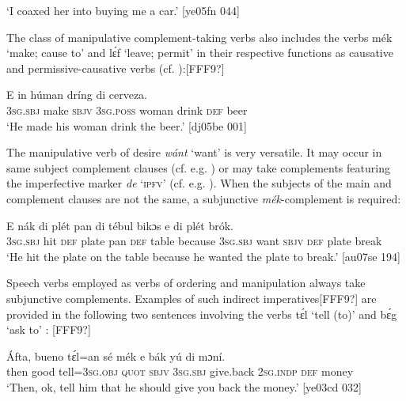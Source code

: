 \glt ‘I coaxed her into buying me a car.’ [ye05fn 044]
\z

The class of manipulative complement-taking verbs also includes the verbs mék ‘make; cause to’  and lɛ́f ‘leave; permit’ in their respective functions as causative and permissive-causative verbs (cf. ):[FFF9?]


\ea%
    \label{ex:key:1399}
    \gll E            in    húman  dríng  di  cerveza.\\
\textsc{3sg.sbj}  make  \textsc{sbjv}    \textsc{3sg.poss}  woman  drink  \textsc{def}  beer\\

\glt ‘He made his woman drink the beer.’ [dj05be 001]
\z

The manipulative verb of desire \textit{wánt} ‘want’ is very versatile. It may occur in same subject complement clauses (cf. e.g. ) or may take complements featuring the imperfective marker \textit{de} ‘\textsc{ipfv}’ (cf. e.g. ). When the subjects of the main and complement clauses are not the same, a subjunctive \textit{mék}{}-complement is required: 


\ea%
    \label{ex:key:1400}
    \gll E    nák  di  plét    pan  di  tébul  bikɔs  e    
    di  plét    brók.\\
\textsc{3sg.sbj}  hit  \textsc{def}  plate  pan  \textsc{def}  table  because  \textsc{3sg.sbj}  want
\textsc{sbjv}    \textsc{def}  plate  break\\

\glt ‘He hit the plate on the table because he wanted the plate to break.’ [au07se 194]
\z

Speech verbs employed as verbs of ordering and manipulation always take subjunctive complements. Examples of such indirect imperatives[FFF9?] are provided in the following two sentences involving the verbs tɛ́l ‘tell (to)’  and bɛ́g ‘ask to’ : [FFF9?]


\ea%
    \label{ex:key:1401}
    \gll \'{A}fta,  bueno  tɛ́l=an    sé    mék    e    bák
yú    di  mɔní.\\
then  good  tell=\textsc{3sg.obj}  \textsc{quot}    \textsc{sbjv}    \textsc{3sg.sbj}  give.back
\textsc{2sg.indp}  \textsc{def}  money\\

\glt ‘Then, ok, tell him that he should give you back the money.’ [ye03cd 032]
\z


